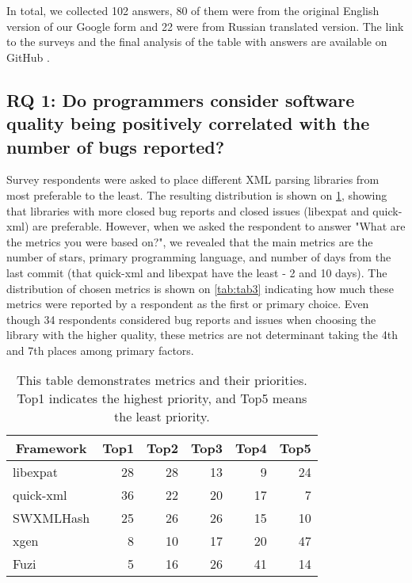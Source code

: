 \documentclass[11pt,review,sigplan,nonacm,natbib=false]{acmart}
\begin{document}
In total, we collected 102 answers, 80 of them were from the original English version of our Google form and 22 were from Russian translated version. The link to the surveys and the final analysis of the table with answers are available on GitHub \cite{Mutalapov_Survey_on_the_2023}.

\subsection{RQ 1: Do programmers consider software quality being positively correlated with the number of bugs reported?}

Survey respondents were asked to place different XML parsing libraries from most preferable to the least. The resulting distribution is shown on \cref{tab:tab2}, showing that libraries with more closed bug reports and closed issues (libexpat and quick-xml) are preferable. However, when we asked the respondent to answer "What are the metrics you were based on?", we revealed that the main metrics are the number of stars, primary programming language, and number of days from the last commit (that quick-xml and libexpat have the least - 2 and 10 days). The distribution of chosen metrics is shown on \cref{tab:tab3} indicating how much these metrics were reported by a respondent as the first or primary choice. Even though 34 respondents considered bug reports and issues when choosing the library with the higher quality, these metrics are not determinant taking the 4th and  7th places among primary factors.


\begin{table}
    \begin{tabular}{l *{5}{r}}
    \hline
    \multicolumn{1}{c}{Framework} &  \multicolumn{1}{c}{Top1} &  \multicolumn{1}{c}{Top2} &  \multicolumn{1}{c}{Top3} &  \multicolumn{1}{c}{Top4} &  \multicolumn{1}{c}{Top5} \\
    \hline
    libexpat & 28 & 28 & 13 & 9 & 24 \\
    \hline
    quick-xml & 36 & 22 & 20 & 17 & 7 \\
    \hline
    SWXMLHash & 25 & 26 & 26 & 15 & 10 \\
    \hline
    xgen & 8 & 10 & 17 & 20 & 47 \\
    \hline
    Fuzi & 5 & 16 & 26 & 41 & 14 \\
    \hline
    \end{tabular}
\caption{This table demonstrates metrics and their priorities. Top1 indicates the highest priority, and Top5 means the least priority.}
\label{tab:tab2}
\end{table}
\end{document}
